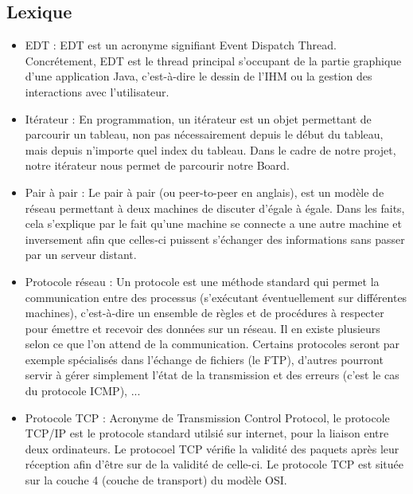 \newpage
\begin{appendices}
\section{Lexique}
\begin{itemize}
	\item EDT :
	EDT est un acronyme signifiant Event Dispatch Thread. Concrétement, EDT est le thread principal s'occupant de la partie graphique d'une application Java, c'est-à-dire le dessin de l'IHM ou la gestion des interactions avec l'utilisateur.
	\newline

	\item Itérateur :
	En programmation, un itérateur est un objet permettant de parcourir un tableau, non pas nécessairement depuis le début du tableau, mais depuis n'importe quel index du tableau. Dans le cadre de notre projet, notre itérateur nous permet de parcourir notre Board.
	\newline

	\item Pair à  pair :
    Le pair à  pair (ou peer-to-peer en anglais), est un modèle de réseau permettant à  deux machines de discuter d'égale à  égale.
    Dans les faits, cela s'explique par le fait qu'une machine se connecte a une autre machine et inversement afin que celles-ci puissent s'échanger des informations sans passer par un serveur distant.
    \newline
    
   	\item Protocole réseau :
    Un protocole est une méthode standard qui permet la communication entre des processus (s'exécutant éventuellement sur différentes machines), c'est-à-dire un ensemble de règles et de procédures à respecter pour émettre et recevoir des données sur un réseau. 
    Il en existe plusieurs selon ce que l'on attend de la communication. Certains protocoles seront par exemple spécialisés dans l'échange de fichiers (le FTP), d'autres pourront servir à gérer simplement l'état de la transmission et des erreurs (c'est le cas du protocole ICMP), ... 
	\newline

	\item Protocole TCP : 
    Acronyme de Transmission Control Protocol, le protocole TCP/IP est le protocole standard utilsié sur internet, pour la liaison entre deux ordinateurs.
    Le protocoel TCP vérifie la validité des paquets après leur réception afin d'être sur de la validité de celle-ci. 
    Le protocole TCP est située sur la couche 4 (couche de transport) du modèle OSI. 
	\newline
	

\end{itemize}
\end{appendices}
